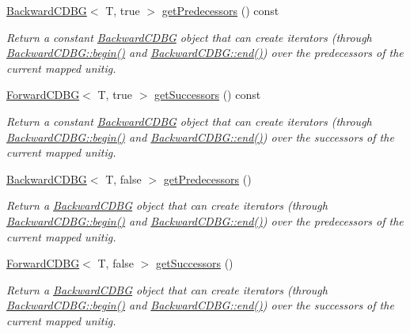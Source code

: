 \begin{DoxyCompactItemize}
\hyperlink{classBackwardCDBG}{Backward\+C\+D\+BG}$<$ T, true $>$ \hyperlink{structUnitigMap_aed2e39718b72838f4cc813577898a926}{get\+Predecessors} () const
\begin{DoxyCompactList}\small\item\em Return a constant \hyperlink{classBackwardCDBG}{Backward\+C\+D\+BG} object that can create iterators (through \hyperlink{classBackwardCDBG_ae7da438db925caebd02493ac7b1c01ab}{Backward\+C\+D\+B\+G\+::begin()} and \hyperlink{classBackwardCDBG_a898f45d400da7b0153644b5417b07657}{Backward\+C\+D\+B\+G\+::end()}) over the predecessors of the current mapped unitig. \end{DoxyCompactList}\item 
\hyperlink{classForwardCDBG}{Forward\+C\+D\+BG}$<$ T, true $>$ \hyperlink{structUnitigMap_a88005a00159b310711230733e16e2ae7}{get\+Successors} () const
\begin{DoxyCompactList}\small\item\em Return a constant \hyperlink{classBackwardCDBG}{Backward\+C\+D\+BG} object that can create iterators (through \hyperlink{classBackwardCDBG_ae7da438db925caebd02493ac7b1c01ab}{Backward\+C\+D\+B\+G\+::begin()} and \hyperlink{classBackwardCDBG_a898f45d400da7b0153644b5417b07657}{Backward\+C\+D\+B\+G\+::end()}) over the successors of the current mapped unitig. \end{DoxyCompactList}\item 
\hyperlink{classBackwardCDBG}{Backward\+C\+D\+BG}$<$ T, false $>$ \hyperlink{structUnitigMap_af2bb9574c7a55bb0e8a564e89a1aa7c6}{get\+Predecessors} ()
\begin{DoxyCompactList}\small\item\em Return a \hyperlink{classBackwardCDBG}{Backward\+C\+D\+BG} object that can create iterators (through \hyperlink{classBackwardCDBG_ae7da438db925caebd02493ac7b1c01ab}{Backward\+C\+D\+B\+G\+::begin()} and \hyperlink{classBackwardCDBG_a898f45d400da7b0153644b5417b07657}{Backward\+C\+D\+B\+G\+::end()}) over the predecessors of the current mapped unitig. \end{DoxyCompactList}\item 
\hyperlink{classForwardCDBG}{Forward\+C\+D\+BG}$<$ T, false $>$ \hyperlink{structUnitigMap_a4892fdd7f02c0b132b0164460159df9e}{get\+Successors} ()
\begin{DoxyCompactList}\small\item\em Return a \hyperlink{classBackwardCDBG}{Backward\+C\+D\+BG} object that can create iterators (through \hyperlink{classBackwardCDBG_ae7da438db925caebd02493ac7b1c01ab}{Backward\+C\+D\+B\+G\+::begin()} and \hyperlink{classBackwardCDBG_a898f45d400da7b0153644b5417b07657}{Backward\+C\+D\+B\+G\+::end()}) over the successors of the current mapped unitig. \end{DoxyCompactList}\end{DoxyCompactItemize}

